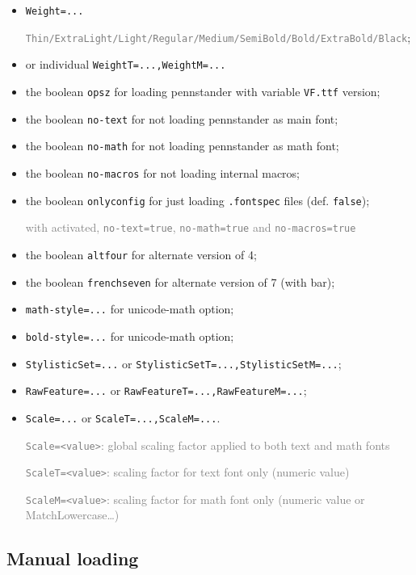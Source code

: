 \documentclass[a4paper]{scrartcl}
\newcommand*{\opt}[1]{\texttt{#1}}
\begin{document}
\begin{itemize}
	\item \opt{Weight=...}
	
	\textcolor{gray}{\footnotesize \opt{Thin/ExtraLight/Light/Regular/Medium/SemiBold/Bold/ExtraBold/Black}};
	\item or individual \opt{WeightT=...,WeightM=...}
	\item the boolean \opt{opsz} for loading pennstander with variable \texttt{VF.ttf} version;
	\item the boolean \opt{no-text} for not loading pennstander as main font;
	\item the boolean \opt{no-math} for not loading pennstander as math font;
	\item the boolean \opt{no-macros} for not loading internal macros;
	\item the boolean \opt{onlyconfig} for just loading \opt{.fontspec} files (def. \opt{false});
	
	\textcolor{gray}{\footnotesize with activated, \opt{no-text=true}, \opt{no-math=true} and \opt{no-macros=true}}
	\item the boolean \opt{altfour} for alternate version of 4;
	\item the boolean \opt{frenchseven} for alternate version of 7 (with bar);
	\item \opt{math-style=...} for unicode-math option;
	\item \opt{bold-style=...} for unicode-math option;
	\item \opt{StylisticSet=...} or \opt{StylisticSetT=...,StylisticSetM=...};
	\item \opt{RawFeature=...} or \opt{RawFeatureT=...,RawFeatureM=...};
	\item \opt{Scale=...} or \opt{ScaleT=...,ScaleM=...}.
	
	\textcolor{gray}{\footnotesize\opt{Scale=<value>}: global scaling factor applied to both text and math fonts}
	
	\textcolor{gray}{\footnotesize\opt{ScaleT=<value>}: scaling factor for text font only (numeric value)}
	
	\textcolor{gray}{\footnotesize\opt{ScaleM=<value>}: scaling factor for math font only (numeric value or MatchLowercase\ldots)}
\end{itemize}

\pagebreak

\subsection{Manual loading}
\end{document}
